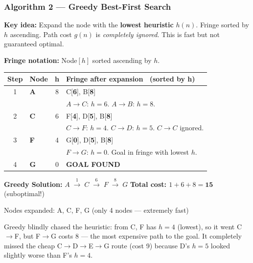 \documentclass[12pt, a4paper]{article}
\newenvironment{answerbox}{\begin{mdframed}[style=answerframe]}{\end{mdframed}}
\newcommand{\goal}{\textcolor{green!55!black}{\textbf{GOAL FOUND}}}
\begin{document}
\vspace{1em}

\subsubsection*{Algorithm 2 — Greedy Best-First Search}

\textbf{Key idea:} Expand the node with the \textbf{lowest heuristic} $h(n)$. Fringe sorted by $h$ ascending.
Path cost $g(n)$ is \emph{completely ignored}. This is fast but not guaranteed optimal.

\textbf{Fringe notation:} Node$[h]$ sorted ascending by $h$.

\vspace{0.4em}
\begin{center}
\renewcommand{\arraystretch}{1.3}
\small
\begin{tabular}{c|l|c|p{9cm}}
\toprule
\textbf{Step} & \textbf{Node} & \textbf{h} &
\textbf{Fringe after expansion \ (sorted by h)} \\
\midrule
1 & \textbf{A} & 8
  & C[\textbf{6}],\; B[\textbf{8}] \\
  & & & \footnotesize $A{\to}C$: $h{=}6$. $A{\to}B$: $h{=}8$. \\
\midrule
2 & \textbf{C} & 6
  & F[\textbf{4}],\; D[\textbf{5}],\; B[\textbf{8}] \\
  & & & \footnotesize $C{\to}F$: $h{=}4$. $C{\to}D$: $h{=}5$. $C{\to}C$ ignored. \\
\midrule
3 & \textbf{F} & 4
  & G[\textbf{0}],\; D[\textbf{5}],\; B[\textbf{8}] \\
  & & & \footnotesize $F{\to}G$: $h{=}0$. Goal in fringe with lowest $h$. \\
\midrule
4 & \textbf{G} & 0
  & \goal \\
\bottomrule
\end{tabular}
\end{center}

\begin{answerbox}
\textbf{Greedy Solution:} $A \;\xrightarrow{1}\; C \;\xrightarrow{6}\; F \;\xrightarrow{8}\; G$
\hfill \textbf{Total cost: $1+6+8 = \mathbf{15}$} (suboptimal!)

Nodes expanded: A, C, F, G \quad(only 4 nodes — extremely fast)

Greedy blindly chased the heuristic: from C, F has $h{=}4$ (lowest), so it went C$\to$F, but F$\to$G costs 8 — the most expensive path to the goal. It completely missed the cheap C$\to$D$\to$E$\to$G route (cost 9) because D's $h{=}5$ looked slightly worse than F's $h{=}4$.
\end{answerbox}
\end{document}
